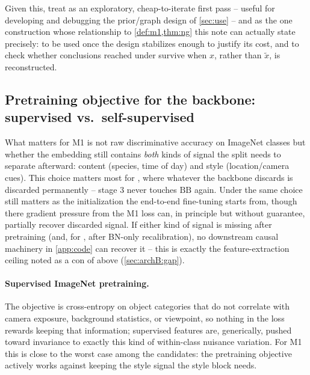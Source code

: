 Given this, treat  as an exploratory, cheap-to-iterate first pass -- useful for
developing and debugging the prior/graph design of \cref{sec:use} -- and  as the one
construction whose relationship to \cref{def:m1,thm:ng} this note can actually state precisely: to be
used once the design stabilizes enough to justify its cost, and to check whether conclusions reached
under  survive when $x$, rather than $\tilde x$, is reconstructed.

\subsection{Pretraining objective for the backbone: supervised vs.\ self-supervised}
\label{sec:pretrain}
What matters for M1 is not raw discriminative accuracy on ImageNet classes but whether the embedding
still contains \emph{both} kinds of signal the split needs to separate afterward: content (species,
time of day) and style (location/camera cues). This choice matters most for , where
whatever the backbone discards is discarded permanently -- stage 3 never touches $\mathrm{BB}$ again.
Under  the same choice still matters as the initialization the end-to-end
fine-tuning starts from, though there gradient pressure from the M1 loss can, in principle but without
guarantee, partially recover discarded signal. If either kind of signal is missing after pretraining
(and, for , after BN-only recalibration), no downstream causal machinery in
\cref{app:code} can recover it -- this is exactly the feature-extraction ceiling noted as a con of
 above (\cref{sec:archB:gap}).

\paragraph{Supervised ImageNet pretraining.}
The objective is cross-entropy on object categories that do not correlate with camera exposure,
background statistics, or viewpoint, so nothing in the loss rewards keeping that information;
supervised features are, generically, pushed toward invariance to exactly this kind of within-class
nuisance variation. For M1 this is close to the worst case among the candidates: the pretraining
objective actively works against keeping the style signal the style block needs.

